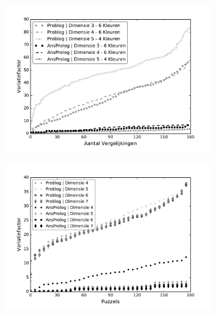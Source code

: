 \documentclass{article}
\begin{document}
	\begin{figure}[t]
\centering
\begin{subfigure}{.33\textwidth}
  \centering
  \includegraphics[width=\linewidth]{Grafieken/Variatie/Chromatic Maze/chm.pdf}
  \caption{}
  \label{fig:sub1}
\end{subfigure}%
\begin{subfigure}{.33\textwidth}
  \centering
  \includegraphics[width=\linewidth]{Grafieken/Variatie/Dungeon/dungeon.pdf}
  \caption{}
  \label{fig:sub2}
\end{subfigure}
\begin{subfigure}{.33\textwidth}
  \centering

\end{subfigure}
\end{figure}
\end{document}
